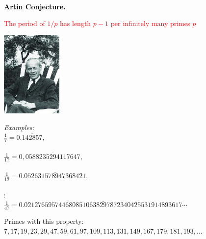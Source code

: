 \documentclass[landscape,display]{powersem} %
\newcommand{\heading}[1]{%
 \begin{center}
  \large\bf
  \shadowbox{{\textcolor{conceptcolor}{#1}}}%
 \end{center}
 \vspace{1ex minus 1ex}}
\begin{document}
\begin{slide}
\heading{Some conjectures about prime numbers: 4/5}\pause

\textcolor{black}{\textbf{Artin Conjecture.}} \pause

\textcolor{red}{ The period of $1/p$ has length $p-1$ per infinitely many primes  $p$}\pause


 \includegraphics[width=3cm]{images/EmilArtin.jpg}\pause

\vspace{-4cm}
\hspace*{3.5cm}
\begin{minipage}{8cm}
\textit{Examples:} \\
$\frac17=0.\overline{142857}$,\\
\\
$\frac1{17}=0,\overline{0588235294117647}$,\\
\\
$\frac1{19}=0.\overline{052631578947368421},$\\
\\
$\vdots $\\
$\frac1{47}=$\scriptsize{$0.\overline{0212765957446808510638297872340425531914893617} \cdots$}\end{minipage}\bigskip\bigskip\medskip\pause

\begin{scriptsize}
Primes with this property: $7, 17, 19, 23, 29, 47, 59, 61, 97, 109, 113, 131, 149, 167, 179, 181, 193,\ldots$
\end{scriptsize}


\end{slide}
\end{document}
